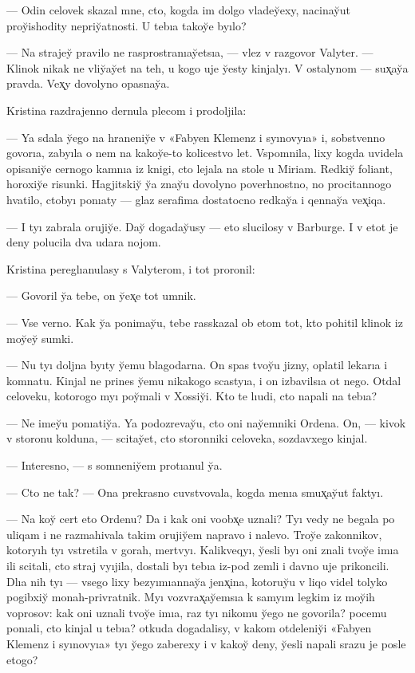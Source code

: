 \documentclass[10pt]{book}
\begin{document}
— Odin celovek skazal mne, cto, kogda im dolgo vladey̆exy, nacinay̆ut proy̆ishodity nepriy̆atnosti. U tebıa takoy̆e byılo?

— Na strajey̆ pravilo ne rasprostranıay̆etsıa, — vlez v razgovor Valyter. — Klinok nikak ne vliy̆ay̆et na teh, u kogo uje y̆esty kinjalyı. V ostalynom — sux̨ay̆a pravda. Vex̨y dovolyno opasnay̆a.

Kristina razdrajenno dernula plecom i prodoljila:

— Ya sdala y̆ego na hraneniy̆e v «Fabyen Klemenz i syınovyıa» i, sobstvenno govorıa, zabyıla o nem na kakoy̆e-to kolicestvo let. Vspomnila, lixy kogda uvidela opisaniy̆e cernogo kamnıa iz knigi, cto lejala na stole u Miriam. Redkiy̆ foliant, horoxiy̆e risunki. Hagjitskiy̆ y̆a znay̆u dovolyno poverhnostno, no procitannogo hvatilo, ctobyı ponıaty — glaz serafima dostatocno redkay̆a i qennay̆a vex̨iqa.

— I tyı zabrala orujiy̆e. Day̆ dogaday̆usy — eto slucilosy v Barburge. I v etot je deny polucila dva udara nojom.

Kristina pereglıanulasy s Valyterom, i tot proronil:

— Govoril y̆a tebe, on y̆ex̨e tot umnik.

— Vse verno. Kak y̆a ponimay̆u, tebe rasskazal ob etom tot, kto pohitil klinok iz moy̆ey̆ sumki.

— Nu tyı doljna byıty y̆emu blagodarna. On spas tvoy̆u jizny, oplatil lekarıa i komnatu. Kinjal ne prines y̆emu nikakogo scastyıa, i on izbavilsıa ot nego. Otdal celoveku, kotorogo myı poy̆mali v Xossiy̆i. Kto te lıudi, cto napali na tebıa?

— Ne imey̆u ponıatiy̆a. Ya podozrevay̆u, cto oni nay̆emniki Ordena. On, — kivok v storonu kolduna, — scitay̆et, cto storonniki celoveka, sozdavxego kinjal.

— Interesno, — s somneniy̆em protıanul y̆a.

— Cto ne tak? — Ona prekrasno cuvstvovala, kogda menıa smux̨ay̆ut faktyı.

— Na koy̆ cert eto Ordenu? Da i kak oni voobx̨e uznali? Tyı vedy ne begala po uliqam i ne razmahivala takim orujiy̆em napravo i nalevo. Troy̆e zakonnikov, kotoryıh tyı vstretila v gorah, mertvyı. Kalikveqyı, y̆esli byı oni znali tvoy̆e imıa ili scitali, cto straj vyıjila, dostali byı tebıa iz-pod zemli i davno uje prikoncili. Dlıa nih tyı — vsego lixy bezyımıannay̆a jenx̨ina, kotoruy̆u v liqo videl tolyko pogibxiy̆ monah-privratnik. Myı vozvrax̨ay̆emsıa k samyım legkim iz moy̆ih voprosov: kak oni uznali tvoy̆e imıa, raz tyı nikomu y̆ego ne govorila? pocemu ponıali, cto kinjal u tebıa? otkuda dogadalisy, v kakom otdeleniy̆i «Fabyen Klemenz i syınovyıa» tyı y̆ego zaberexy i v kakoy̆ deny, y̆esli napali srazu je posle etogo?
\end{document}
